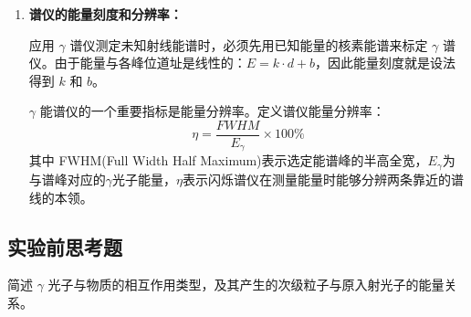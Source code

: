 \documentclass[dvipsnames, svgnames,a4paper,11pt]{article}
\begin{document}
\begin{enumerate}
\begin{itemize}
		
		
		
			\end{itemize}

		\item \textbf{谱仪的能量刻度和分辨率：}
			
			应用 $\gamma$ 谱仪测定未知射线能谱时，必须先用已知能量的核素能谱来标定 $\gamma$ 谱仪。由于能量与各峰位道址是线性的：$E = k \cdot d + b$，因此能量刻度就是设法得到 $k$ 和 $b$。

			$\gamma$ 能谱仪的一个重要指标是能量分辨率。定义谱仪能量分辨率：
			\[
				\eta = \frac{FWHM}{E_\gamma} \times 100 \%
			\]
			其中 FWHM(Full Width Half Maximum)表示选定能谱峰的半高全宽，$E_\gamma$为与谱峰对应的$\gamma$光子能量，$\eta$表示闪烁谱仪在测量能量时能够分辨两条靠近的谱线的本领。
			
	\end{enumerate}




\subsection{实验前思考题}

\begin{question}
	简述 $\gamma$ 光子与物质的相互作用类型，及其产生的次级粒子与原入射光子的能量关系。
\end{question}

		


		
			
\end{document}
